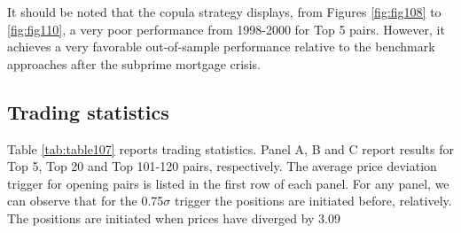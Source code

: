 \documentclass[a4paper]{article}
\begin{document}
	It should be noted that the copula strategy displays, from Figures \ref{fig:fig108} to \ref{fig:fig110}, a very poor performance from 1998-2000 for Top 5 pairs. However, it achieves a very favorable out-of-sample performance relative to the benchmark approaches after the subprime mortgage crisis.
	
%	
%	

	
	\vspace{0.3cm}
	
	\subsection{Trading statistics}
	
	Table \ref{tab:table107} reports trading statistics. Panel A, B and C report results for Top 5, Top 20 and Top 101-120 pairs, respectively. The average price deviation trigger for opening pairs is listed in the first row of each panel. For any panel, we can observe that for the 0.75$\sigma$ trigger the positions are initiated before, relatively. The positions are initiated when prices have diverged by 3.09\\%
	
\end{document}
